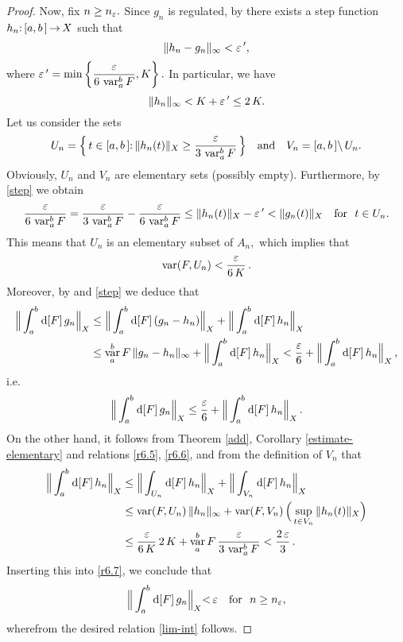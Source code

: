 \documentclass[12pt,twoside]{article}
\numberwithin{equation}{section}
\theoremstyle{plain}
\theoremstyle{definition}
\DeclareMathOperator{\var}{var}
\begin{document}
{\begin{proof}
\smallskip

Now, fix $n\ge n_\varepsilon.$ Since $g_n$ is regulated, by \cite[Theorem I.3.1]{H} there exists
a step function $h_n{:}\,[a,b\,]\,{\to}\,X$ such that
\begin{equation}\label{step}
   \|h_n-g_n\|_\infty<\eps\,',
\end{equation}
where $\eps\,'=\min\left\{\dfrac{\eps}{6\,\var_a^bF},K\right\}.$ In particular, we have
\begin{equation}\label{r6.5}
   \|h_n\|_\infty<K+\eps\,'\leq 2\,K.
\end{equation}
Let us consider the sets
\[
   U_n=\Big\{\,t\in\ab{:}\,\|h_n(t)\|_X\ge\frac{\eps}{3\,\var_a^bF}\,\Big\}
   \quad\mbox{and}\quad
   V_n=\ab{\setminus}\, U_n.
\]
Obviously, $U_n$ and $V_n$ are elementary sets (possibly empty). Furthermore, by \eqref{step}
we obtain
\[
    \frac{\eps}{6\,\var_a^bF}
   =\frac{\eps}{3\,\var_a^bF}-\frac{\eps}{6\,\var_a^bF}
   \le\|h_n(t)\|_X-\eps{\,'}<\|g_n(t)\|_X
   \quad\mbox{for \ } t\in U_n.
\]
This means that $U_n$ is an elementary subset of $A_n,$ which implies that
\begin{equation}\label{r6.6}
    \var(F,U_n)<\frac{\eps}{6\,K}\,.
\end{equation}
Moreover, by \cite[Proposition 10]{Sch1} and \eqref{step} we deduce that
\begin{align*}
   \Big\|\int_a^b \dd[F]\,g_n\Big\|_X
   &\le\Big\|\int_a^b\dd[F]\,(g_n-h_n)\Big\|_X+\Big\|\int_a^b\dd[F]\,h_n\Big\|_X
  \\
   &\le\var_a^b F\,\|g_n-h_n\|_\infty+\Big\|\int_a^b\dd[F]\,h_n\Big\|_X
      <\frac{\eps}{6}+\Big\|\int_a^b\dd[F]\,h_n\Big\|_X\,,
\end{align*}
i.e.
\begin{equation}\label{r6.7}
  \Big\|\int_a^b\dd[F]\,g_n\Big\|_X
  \le\frac{\eps}{6}+\Big\|\int_a^b\dd[F]\,h_n\Big\|_X\,.
\end{equation}
On the other hand, it follows from Theorem \ref{add}, Corollary \ref{estimate-elementary}
and relations \eqref{r6.5}, \eqref{r6.6}, and from the definition of $V_n$ that
\begin{align*}
    \Big\|\int_a^b\dd[F]\,h_n\Big\|_X
   &\le\Big\|\int_{U_n}\dd[F]\,h_n\Big\|_X+\Big\|\int_{V_n}\dd[F]\,h_n\Big\|_X
  \\
   &\le\var(F,U_n)\,\|h_n\|_\infty+\var(F,V_n)\,\Big(\sup_{t\in V_n}\|h_n(t)\|_X\Big)
  \\
   &\le\frac{\eps}{6\,K}\,2\,K+\var_a^bF\,\frac{\eps}{3\,\var_a^bF}
    <\frac{2\,\eps}{3}\,.
\end{align*}
Inserting this into \eqref{r6.7}, we conclude that
\[
   \displaystyle\Big\|\int_a^b\hskip0.2mm\mbox{\rm d}[F]\,g_n\Big\|_X{<}\,\varepsilon
   \quad\mbox{for \ } n\ge n_\varepsilon,
\]
wherefrom the desired relation \eqref{lim-int} follows.
\end{proof}

}
\end{document}
